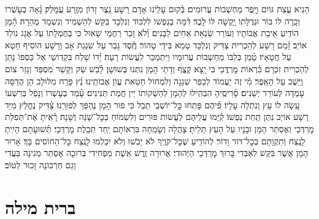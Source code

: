\documentclass[twoside, openany, parskip=half, 11pt]{book}
\begin{document}
הֵנִיא עֲצַת גּוֹיִם וַיָּֽפֶר מַחְשְׁבוֹת עֲרוּמִים׃ \hfill \break
בְּ֗קוּם עָלֵֽינוּ אָדָם רָשָׁע נֵֽצֶר זָדוֹן מִזֶּֽרַע עֲמָלֵק׃ \hfill \break
גָּ֗אָה בְעָשְׁרוֹ וְכָֽרָה לוֹ בּוֹר וּגְדֻלָּתוֹ יָֽקְשָׁה לּוֹ לָֽכֶד׃ \hfill \break
דִּ֗מָּה בְנַפְשׁוֹ לִלְכּוֹד וְנִלְכָּד בִּקֵּשׁ לְהַשְׁמִיד וְנִשְׁמַד מְהֵרָה׃ \hfill \break
הָ֗מָן הוֹדִֽיעַ אֵיבַת אֲבוֹתָיו וְעוֹרֵר שִׂנְאַת אַחִים לַבָּנִים׃ \hfill \break
וְ֗לֹא זָכַר רַחֲמֵי שָׁאוּל כִּי בְחֶמְלָתוֹ עַל אֲגָג נוֹלַד אוֹיֵב׃ \hfill \break
זָ֗מַם רָשָׁע לְהַכְרִית צַדִּיק וְנִלְכַּד טָמֵא בִּידֵי טָהוֹר׃ \hfill \break
חֶֽ֗סֶד גָּבַר עַל שִׁגְגַת אָב וְרָשָׁע הוֹסִיף חֵטְא עַל חֲטָאָיו׃ \hfill \break
טָ֗מַן בְּלִבּוֹ מַחְשְׁבוֹת עֲרוּמָיו וַיִּתְמַכֵּר לַעֲשׂוֹת רָעָה׃ \hfill \break
יָ֗דוֹ שָׁלַח בִּקְדֽוֹשֵי אֵל כַּסְפּוֹ נָתַן לְהַכְרִית זִכְרָם׃ \hfill \break
כִּ֗רְאוֹת מׇרְדֳּכַי כִּי יָֽצָא קֶֽצֶף וְדָתֵי הָמָן נִתְּנוּ בְּשׁוּשָׁן׃ \hfill \break
לָ֗בַשׁ שַׂק וְקָשַׁר מִסְפֵּד וְגָזַר צוֹם וַיֵּֽשֶׁב עַל הָאֵֽפֶר׃ \hfill \break
מִ֗י זֶה יַעֲמוֹד לְכַפֵּר שְׁגָגָה וְלִמְחוֹל חַטַּאת עֲוֹן אֲבוֹתֵֽינוּ׃ \hfill \break
נֵ֗ץ פָּרַח מִלּוּלָב הֵן הֲדַסָּה עָמְדָה לְעוֹרֵר יְשֵׁנִים׃ \hfill \break
סָ֗רִיסֶֽיהָ הִבְהִֽילוּ לְהָמָן לְהַשְׁקוֹתוֹ יֵין חֲמַת תַּנִּינִים׃ \hfill \break
עָ֗מַד בְעָשְׁרוֹ וְנָפַל בְּרִשְׁעוֹ עָֽשָׂה לוֹ עֵץ וְנִתְלָה עָלָיו׃ \hfill \break
פִּ֗יהֶם פָּתְחוּ כׇּל־יוֹשְׁבֵי תֵבֵל כִּי פוּר הָמָן נֶהְפַּךְ לְפוּרֵֽנוּ׃ \hfill \break
צַ֗דִּיק נֶחֱלַץ מִיַּד רָשָׁע אוֹיֵב נִתַּן תַּֽחַת נַפְשׁוֹ׃ \hfill \break
קִ֗יְּמוּ עֲלֵיהֶם לַעֲשׂוֹת פּוּרִים וְלִשְׂמוֹחַ בְּכׇל־שָׁנָה וְשָׁנָה׃ \hfill \break
רָ֗אִֽיתָ אֶת־תְּפִלַּת מׇרְדְּכַי וְאֶסְתֵּר הָמָן וּבָנָיו עַל הָעֵץ תָּלִֽיתָ׃ \hfill \break
{}
צָהֲלָה וְשָׂמֵֽחָה בִּרְאוֹתָם יַֽחַד תְּכֵֽלֶת מׇרְדְּכָי׃ \hfill \break
תְּ֗שׁוּעָתָם הָיִֽיתָ לָנֶֽצַח וְתִקְוָתָם בְּכׇל־דּוֹר וָדוֹר׃ \hfill \break
לְהוֹדִֽיעַ שֶׁכׇּל־קֹוֶֽיךָ לֹא יֵבֹֽשׁוּ וְלֹא יִכָּלְמוּ לָנֶֽצַח כׇּל־הַחוֹסִים בָּךְ׃ \hfill \break
אָרוּר הָמָן אֲשֶׁר בִּקֵּשׁ לְאַבְּדִי בָּרוּךְ מׇרְדְּכַי הַיְּהוּדִי׃ \hfill \break
אֲרוּרָה זֶֽרֶשׁ אֵֽשֶׁת מַפְחִידִי בְּרוּכָה אֶסְתֵּר מְגִינָּה בַּעֲדִי וְגַם חַרְבוֹנָה זָכוּר לְטּוֹב׃

\vfill


\sepline



\chapter[ברית מילה]{ ברית מילה }
\end{document}
